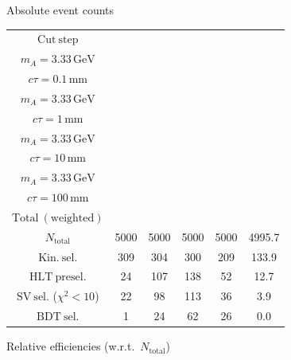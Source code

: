 \documentclass[10pt,a4paper]{article}
\renewcommand{\arraystretch}{1.4}
\begin{document}
{\footnotesize\setlength{\tabcolsep}{4pt}\renewcommand{\arraystretch}{1.05}%
\vspace{12pt}

Absolute event counts

\begin{tabular}{cccccc}
\toprule
$\mathrm{Cut\ step}$ & \shortstack{$m_{\pi}=10\,\mathrm{GeV}$\\$m_{A}=3.33\,\mathrm{GeV}$\\$c\tau=0.1\,\mathrm{mm}$} & \shortstack{$m_{\pi}=10\,\mathrm{GeV}$\\$m_{A}=3.33\,\mathrm{GeV}$\\$c\tau=1\,\mathrm{mm}$} & \shortstack{$m_{\pi}=10\,\mathrm{GeV}$\\$m_{A}=3.33\,\mathrm{GeV}$\\$c\tau=10\,\mathrm{mm}$} & \shortstack{$m_{\pi}=10\,\mathrm{GeV}$\\$m_{A}=3.33\,\mathrm{GeV}$\\$c\tau=100\,\mathrm{mm}$} & \shortstack{$\mathrm{QCD}$\\$\mathrm{Total\ (weighted)}$} \\
\midrule
$N_{\mathrm{total}}$ & 5000 & 5000 & 5000 & 5000 & 4995.7\\
$\mathrm{Kin.\ sel.}$ & 309 & 304 & 300 & 209 & 133.9\\
$\mathrm{HLT\ presel.}$ & 24 & 107 & 138 & 52 & 12.7\\
$\mathrm{SV\ sel.}$ ($\chi^2{<}10$) & 22 & 98 & 113 & 36 & 3.9\\
$\mathrm{BDT\ sel.}$ & 1 & 24 & 62 & 26 & 0.0\\
\bottomrule
\end{tabular}

\vspace{18pt}

Relative efficiencies (w.r.t.\ $N_{\mathrm{total}}$)

}
\end{document}
